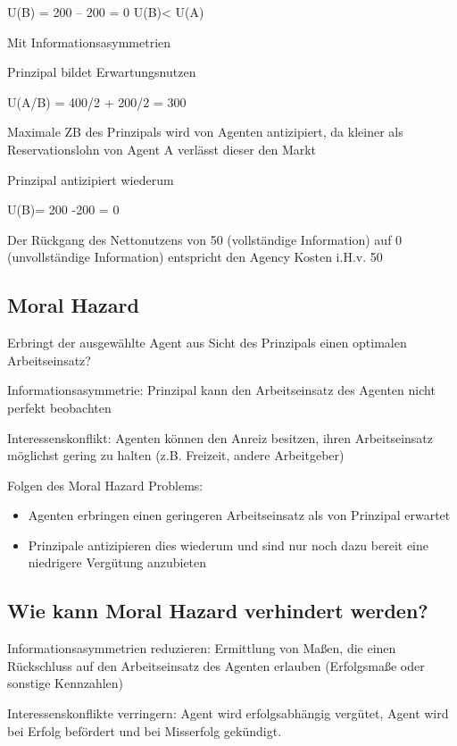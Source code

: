 \documentclass[
]{article}
\providecommand{\tightlist}{%
  \setlength{\itemsep}{0pt}\setlength{\parskip}{0pt}}
\begin{document}
U(B) = 200 -- 200 = 0 U(B)\textless{} U(A)

Mit Informationsasymmetrien

Prinzipal bildet Erwartungsnutzen

U(A/B) = 400/2 + 200/2 = 300

Maximale ZB des Prinzipals wird von Agenten antizipiert, da kleiner als
Reservationslohn von Agent A verlässt dieser den Markt

Prinzipal antizipiert wiederum

U(B)= 200 -200 = 0

Der Rückgang des Nettonutzens von 50 (vollständige Information) auf 0
(unvollständige Information) entspricht den Agency Kosten i.H.v. 50

\hypertarget{moral-hazard}{%
\subsection{Moral Hazard}\label{moral-hazard}}

Erbringt der ausgewählte Agent aus Sicht des Prinzipals einen optimalen
Arbeitseinsatz?

Informationsasymmetrie: Prinzipal kann den Arbeitseinsatz des Agenten
nicht perfekt beobachten

Interessenskonflikt: Agenten können den Anreiz besitzen, ihren
Arbeitseinsatz möglichst gering zu halten (z.B. Freizeit, andere
Arbeitgeber)

Folgen des Moral Hazard Problems:

\begin{itemize}
\tightlist
\item
  Agenten erbringen einen geringeren Arbeitseinsatz als von Prinzipal
  erwartet
\item
  Prinzipale antizipieren dies wiederum und sind nur noch dazu bereit
  eine niedrigere Vergütung anzubieten
\end{itemize}

\hypertarget{wie-kann-moral-hazard-verhindert-werden}{%
\subsection{Wie kann Moral Hazard verhindert
werden?}\label{wie-kann-moral-hazard-verhindert-werden}}

Informationsasymmetrien reduzieren: Ermittlung von Maßen, die einen
Rückschluss auf den Arbeitseinsatz des Agenten erlauben (Erfolgsmaße
oder sonstige Kennzahlen)

Interessenskonflikte verringern: Agent wird erfolgsabhängig vergütet,
Agent wird bei Erfolg befördert und bei Misserfolg gekündigt.
\end{document}
